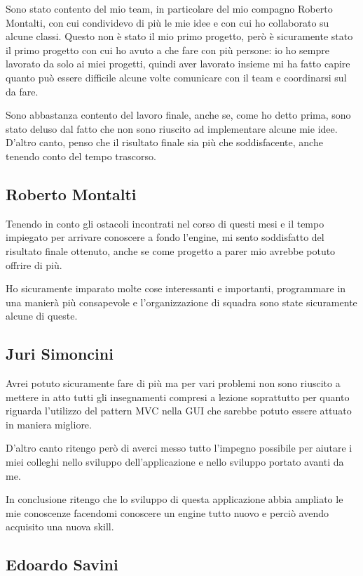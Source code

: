 Sono stato contento del mio team, in particolare del mio compagno Roberto Montalti, con cui condividevo di più le mie idee e con cui ho collaborato su alcune classi. Questo non è stato il mio primo progetto, però è sicuramente stato il primo progetto con cui ho avuto a che fare con più persone: io ho sempre lavorato da solo ai miei progetti, quindi aver lavorato insieme mi ha fatto capire quanto può essere difficile alcune volte comunicare con il team e coordinarsi sul da fare.

Sono abbastanza contento del lavoro finale, anche se, come ho detto prima, sono stato deluso dal fatto che non sono riuscito ad implementare alcune mie idee. D'altro canto, penso che il risultato finale sia più che soddisfacente, anche tenendo conto del tempo trascorso.

\subsection{Roberto Montalti}

Tenendo in conto gli ostacoli incontrati nel corso di questi mesi e il tempo impiegato per arrivare conoscere a fondo l'engine, mi sento soddisfatto del risultato finale ottenuto, anche se come progetto a parer mio avrebbe potuto offrire di più.

Ho sicuramente imparato molte cose interessanti e importanti, programmare in una manierà più consapevole e l'organizzazione di squadra sono state sicuramente alcune di queste.

\subsection{Juri Simoncini}

Avrei potuto sicuramente fare di più ma per vari problemi non sono riuscito a mettere in atto tutti gli insegnamenti compresi a lezione soprattutto per quanto riguarda l'utilizzo del pattern MVC nella GUI che sarebbe potuto essere attuato in maniera migliore.

D'altro canto ritengo però di averci messo tutto l'impegno possibile per aiutare i miei colleghi nello sviluppo dell'applicazione e nello sviluppo portato avanti da me.

In conclusione ritengo che lo sviluppo di questa applicazione abbia ampliato le mie conoscenze facendomi conoscere un engine tutto nuovo e perciò avendo acquisito una nuova skill.

\subsection{Edoardo Savini}

